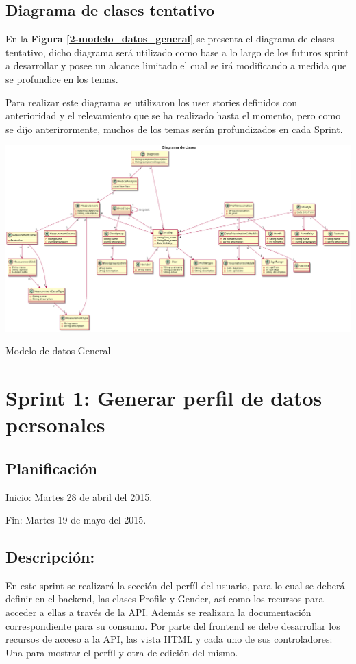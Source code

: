 \subsection{Diagrama de clases tentativo}
{\correccionTexto
En la \textbf{Figura \ref{2-modelo_datos_general}} se presenta el diagrama de clases tentativo, dicho diagrama  será utilizado como base a lo largo de los futuros sprint a desarrollar y posee un alcance limitado el cual se irá modificando a medida que se profundice en los temas.

Para realizar este diagrama se utilizaron los user stories definidos con anterioridad y el relevamiento que se ha realizado hasta el momento, pero como se dijo anterirormente, muchos de los temas serán profundizados en cada Sprint.
}

\begin{correccionSidewaysFigure}
  \centering
  \includegraphics[width=0.9 \textwidth]{img/tp1_parte2/0-DiagramaClasesGeneral}
  \caption{Modelo de datos General}
  \label{2-modelo_datos_general}
\end{correccionSidewaysFigure}


\clearpage %
\section{ Sprint 1: Generar perfil de datos personales}
\subsection{Planificación}
Inicio: Martes 28 de abril del 2015.

Fin: Martes 19 de mayo del 2015.

\subsection{Descripción:}
En este sprint se realizará la sección del perfíl del usuario, para lo cual se deberá definir en el backend, las clases Profile y Gender, así como los recursos para acceder a ellas a través de la API. Además se realizara la documentación correspondiente para su consumo.
Por parte del frontend se debe desarrollar los recursos de acceso a la API, las vista HTML y cada uno de sus controladores: Una para mostrar el perfíl y otra de edición del mismo.

